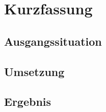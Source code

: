 \chapter*{Kurzfassung}
\vspace{-3cm}
\section*{Ausgangssituation}

\lipsum[2-4][12-18]

\section*{Umsetzung}

\lipsum[2-4][12-18]

\section*{Ergebnis}

\lipsum[2-4][12-18]